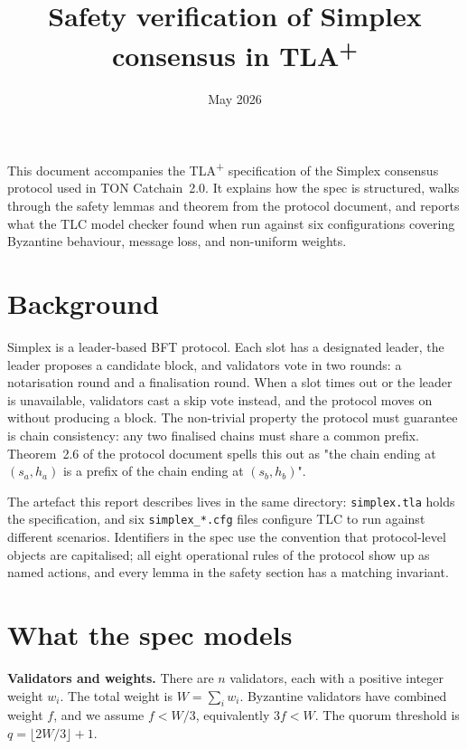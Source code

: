 \documentclass[11pt,a4paper]{article}
\title{\textbf{Safety verification of Simplex consensus in TLA\textsuperscript{+}}}
\date{May 2026}
\begin{document}
\maketitle
\thispagestyle{empty}

\vspace{1em}

This document accompanies the TLA\textsuperscript{+} specification of the
Simplex consensus protocol used in TON Catchain~2.0. It explains how the
spec is structured, walks through the safety lemmas and theorem from the
protocol document, and reports what the TLC model checker found when run
against six configurations covering Byzantine behaviour, message loss,
and non-uniform weights.

\tableofcontents
\bigskip

\section{Background}

Simplex is a leader-based BFT protocol. Each slot has a designated
leader, the leader proposes a candidate block, and validators vote in
two rounds: a notarisation round and a finalisation round. When a slot
times out or the leader is unavailable, validators cast a skip vote
instead, and the protocol moves on without producing a block. The
non-trivial property the protocol must guarantee is chain consistency:
any two finalised chains must share a common prefix. Theorem~2.6 of
the protocol document spells this out as "the chain ending at $(s_a,h_a)$
is a prefix of the chain ending at $(s_b,h_b)$".

The artefact this report describes lives in the same directory:
\verb|simplex.tla| holds the specification, and six \verb|simplex_*.cfg|
files configure TLC to run against different scenarios. Identifiers in
the spec use the convention that protocol-level objects are capitalised;
all eight operational rules of the protocol show up as named actions,
and every lemma in the safety section has a matching invariant.

\section{What the spec models}\label{sec:model}

\textbf{Validators and weights.} There are $n$ validators, each with a
positive integer weight $w_i$. The total weight is $W = \sum_i w_i$.
Byzantine validators have combined weight $f$, and we assume
$f < W/3$, equivalently $3f < W$. The quorum threshold is
$q = \lfloor 2W/3 \rfloor + 1$.
\end{document}

